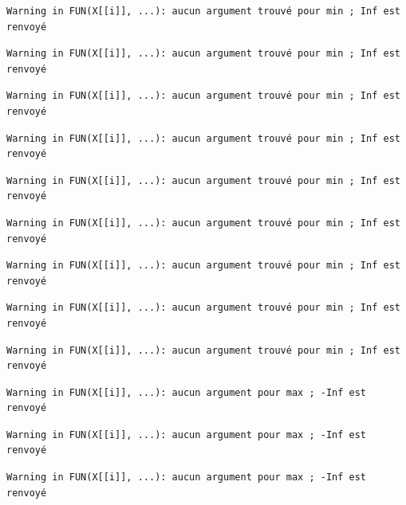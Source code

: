 \documentclass[]{article}
\begin{document}
\begin{verbatim}
Warning in FUN(X[[i]], ...): aucun argument trouvé pour min ; Inf est
renvoyé
\end{verbatim}

\begin{verbatim}
Warning in FUN(X[[i]], ...): aucun argument trouvé pour min ; Inf est
renvoyé
\end{verbatim}

\begin{verbatim}
Warning in FUN(X[[i]], ...): aucun argument trouvé pour min ; Inf est
renvoyé
\end{verbatim}

\begin{verbatim}
Warning in FUN(X[[i]], ...): aucun argument trouvé pour min ; Inf est
renvoyé
\end{verbatim}

\begin{verbatim}
Warning in FUN(X[[i]], ...): aucun argument trouvé pour min ; Inf est
renvoyé
\end{verbatim}

\begin{verbatim}
Warning in FUN(X[[i]], ...): aucun argument trouvé pour min ; Inf est
renvoyé
\end{verbatim}

\begin{verbatim}
Warning in FUN(X[[i]], ...): aucun argument trouvé pour min ; Inf est
renvoyé
\end{verbatim}

\begin{verbatim}
Warning in FUN(X[[i]], ...): aucun argument trouvé pour min ; Inf est
renvoyé
\end{verbatim}

\begin{verbatim}
Warning in FUN(X[[i]], ...): aucun argument trouvé pour min ; Inf est
renvoyé
\end{verbatim}

\begin{verbatim}
Warning in FUN(X[[i]], ...): aucun argument pour max ; -Inf est renvoyé
\end{verbatim}

\begin{verbatim}
Warning in FUN(X[[i]], ...): aucun argument pour max ; -Inf est renvoyé
\end{verbatim}

\begin{verbatim}
Warning in FUN(X[[i]], ...): aucun argument pour max ; -Inf est renvoyé
\end{verbatim}
\end{document}

